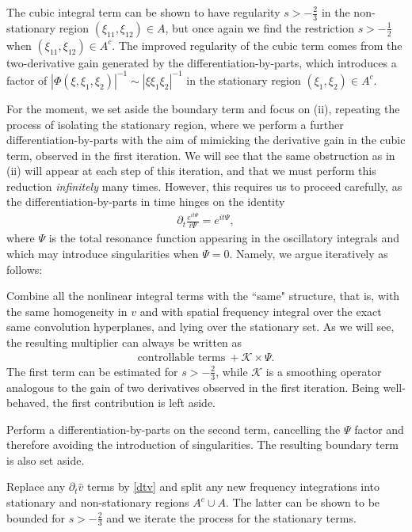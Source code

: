 \documentclass[a4paper,
11pt,  reqno]{amsart}
\newcommand{\5}{\textup{V}}
\newcommand{\noi}{\noindent}
\newcommand{\ft}{\widehat}
\newcommand{\dt}{\partial_t}
\theoremstyle{remark}
\numberwithin{equation}{section}
\numberwithin{theorem}{section}
\begin{document}
\smallskip
\noi{\rm(ii)} The cubic integral term can be shown to have regularity $s>-\frac23$ in the non-stationary region $(\xi_{11}, \xi_{12})\in A$, but once again we find the restriction $s>-\frac12$ when $(\xi_{11}, \xi_{12})\in A^c$.
The improved regularity of the cubic term comes from the two-derivative gain generated by the differentiation-by-parts, which introduces a factor of $|\Phi(\xi,\xi_1, \xi_2)|^{-1} \sim |\xi\xi_1\xi_2|^{-1}$ in the stationary region $(\xi_1,\xi_2)\in A^c$.


\medskip

For the moment, we set aside the boundary term and focus on (ii), repeating the process of isolating the stationary region, where we perform a further differentiation-by-parts with the aim of mimicking the derivative gain in the cubic term, observed in the first iteration. We will see that the same obstruction as in (ii) will appear at each step of this iteration, and that we must perform this reduction \textit{infinitely} many times.
However, this requires us to proceed carefully, as the differentiation-by-parts in time hinges on the identity
\begin{align}
\label{exp}
\partial_t\frac{e^{it\Psi}}{i\Psi} = {e^{it\Psi}},
\end{align}
where $\Psi$ is the total resonance function appearing in the oscillatory integrals and which may introduce singularities when $\Psi=0$.
Namely, we argue iteratively as follows:



    \smallskip
\noi{\bf Step 1.}
    Combine all the nonlinear integral terms with the ``same" structure, that is,
with the same homogeneity in $v$ and with spatial frequency integral over the exact same convolution hyperplanes,  and lying over the stationary set.
As we will see, the resulting multiplier can always be written as
\begin{align}
\text{controllable terms}
\ + \mathcal{K}\times \Psi
.
\end{align}
The first term can be estimated for $s>-\frac23$, while  $\mathcal{K}$ is a smoothing operator analogous to the gain of two derivatives observed in the first iteration. Being well-behaved, the first contribution is left aside.


    \smallskip
\noi{\bf Step 2.}
    Perform a differentiation-by-parts on the second term, cancelling the $\Psi$ factor and therefore avoiding the introduction of singularities. The resulting boundary term is also set aside.

    \smallskip
\noi{\bf Step 3.}
Replace any $\dt \ft{v}$ terms by \eqref{dtv} and split any new frequency integrations into stationary and non-stationary regions $A^c \cup A$. The latter can be shown to be bounded for $s>-\frac23$ and we iterate the process for the stationary terms.
\end{document}
